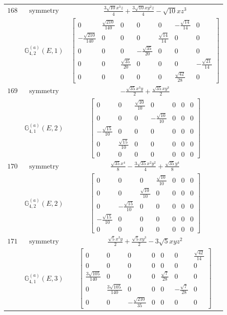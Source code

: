 \documentclass[fleqn,8pt,landscape]{jsarticle}
\begin{document}
\begin{longtable}{ccc}
$ 168 $ & $ \text{symmetry} $ & $ \frac{3 \sqrt{10} x^{3} z}{4} + \frac{3 \sqrt{10} x y^{2} z}{4} - \sqrt{10} x z^{3} $ \\
$  $ & $ \mathbb{G}_{4,2}^{(a)}(E,1) $ & $ \begin{bmatrix} 0 & \frac{\sqrt{210}}{140} & 0 & 0 & 0 & - \frac{\sqrt{14}}{14} & 0 \\ - \frac{\sqrt{210}}{140} & 0 & 0 & 0 & \frac{\sqrt{14}}{14} & 0 & 0 \\ 0 & 0 & 0 & - \frac{\sqrt{35}}{20} & 0 & 0 & 0 \\ 0 & 0 & \frac{\sqrt{35}}{20} & 0 & 0 & 0 & - \frac{\sqrt{21}}{14} \\ 0 & 0 & 0 & 0 & 0 & \frac{\sqrt{42}}{28} & 0 \end{bmatrix} $ \\ \hline
$ 169 $ & $ \text{symmetry} $ & $ - \frac{\sqrt{35} x^{3} y}{2} + \frac{\sqrt{35} x y^{3}}{2} $ \\
$  $ & $ \mathbb{G}_{4,1}^{(a)}(E,2) $ & $ \begin{bmatrix} 0 & 0 & \frac{\sqrt{10}}{10} & 0 & 0 & 0 & 0 \\ 0 & 0 & 0 & - \frac{\sqrt{10}}{10} & 0 & 0 & 0 \\ - \frac{\sqrt{15}}{10} & 0 & 0 & 0 & 0 & 0 & 0 \\ 0 & \frac{\sqrt{15}}{10} & 0 & 0 & 0 & 0 & 0 \\ 0 & 0 & 0 & 0 & 0 & 0 & 0 \end{bmatrix} $ \\ \hline
$ 170 $ & $ \text{symmetry} $ & $ \frac{\sqrt{35} x^{4}}{8} - \frac{3 \sqrt{35} x^{2} y^{2}}{4} + \frac{\sqrt{35} y^{4}}{8} $ \\
$  $ & $ \mathbb{G}_{4,2}^{(a)}(E,2) $ & $ \begin{bmatrix} 0 & 0 & 0 & \frac{\sqrt{10}}{10} & 0 & 0 & 0 \\ 0 & 0 & \frac{\sqrt{10}}{10} & 0 & 0 & 0 & 0 \\ 0 & - \frac{\sqrt{15}}{10} & 0 & 0 & 0 & 0 & 0 \\ - \frac{\sqrt{15}}{10} & 0 & 0 & 0 & 0 & 0 & 0 \\ 0 & 0 & 0 & 0 & 0 & 0 & 0 \end{bmatrix} $ \\ \hline
$ 171 $ & $ \text{symmetry} $ & $ \frac{\sqrt{5} x^{3} y}{2} + \frac{\sqrt{5} x y^{3}}{2} - 3 \sqrt{5} x y z^{2} $ \\
$  $ & $ \mathbb{G}_{4,1}^{(a)}(E,3) $ & $ \begin{bmatrix} 0 & 0 & 0 & 0 & 0 & 0 & \frac{\sqrt{42}}{14} \\ 0 & 0 & 0 & 0 & 0 & 0 & 0 \\ \frac{3 \sqrt{105}}{140} & 0 & 0 & 0 & \frac{\sqrt{7}}{28} & 0 & 0 \\ 0 & \frac{3 \sqrt{105}}{140} & 0 & 0 & 0 & - \frac{\sqrt{7}}{28} & 0 \\ 0 & 0 & - \frac{\sqrt{210}}{35} & 0 & 0 & 0 & 0 \end{bmatrix} $ \\ \hline

\end{longtable}
\end{document}
